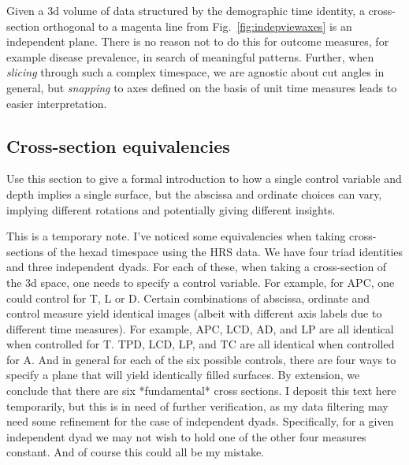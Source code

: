 \documentclass{bmcart}
\begin{document}
Given a 3d volume of data structured by the demographic time identity, a cross-section orthogonal to a magenta line from Fig.~\ref{fig:indepviewaxes} is an independent plane. There is no reason not to do this for outcome measures, for example disease prevalence, in search of meaningful patterns. Further, when \emph{slicing} through such a complex timespace, we are agnostic about cut angles in general, but \emph{snapping} to axes defined on the basis of unit time measures leads to easier interpretation.

\subsection*{Cross-section equivalencies}
Use this section to give a formal introduction to how a single control variable and depth implies a single surface, but the abscissa and ordinate choices can vary, implying different rotations and potentially giving different insights.

This is a temporary note. I've noticed some equivalencies when taking cross-sections of the hexad timespace using the HRS data. We have four triad identities and three independent dyads. For each of these, when taking a cross-section of the 3d space, one needs to specify a control variable. For example, for APC, one could control for T, L or D. Certain combinations of abscissa, ordinate and control measure yield identical images (albeit with different axis labels due to different time measures). For example, APC, LCD, AD, and LP are all identical when controlled for T. TPD, LCD, LP, and TC are all identical when controlled for A. And in general for each of the six possible controls, there are four ways to specify a plane that will yield identically filled surfaces. By extension, we conclude that there are six *fundamental* cross sections. I deposit this text here temporarily, but this is in need of further verification, as my data filtering may need some refinement for the case of independent dyads. Specifically, for a given independent dyad we may not wish to hold one of the other four measures constant. And of course this could all be my mistake.
\end{document}
